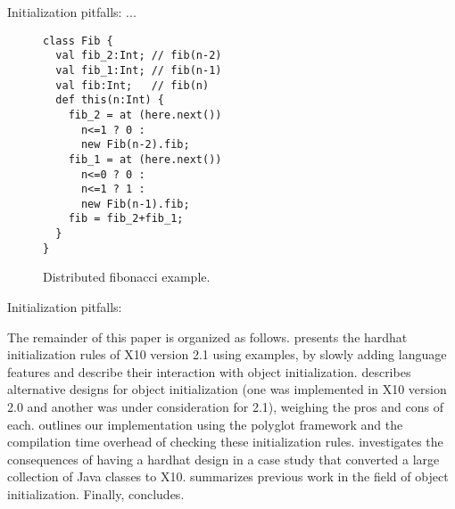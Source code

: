     Initialization pitfalls: ...

\begin{figure}
\begin{lstlisting}
class Fib {
  val fib_2:Int; // fib(n-2)
  val fib_1:Int; // fib(n-1)
  val fib:Int;   // fib(n)
  def this(n:Int) {
    fib_2 = at (here.next())
      n<=1 ? 0 :
      new Fib(n-2).fib;
    fib_1 = at (here.next())
      n<=0 ? 0 :
      n<=1 ? 1 :
      new Fib(n-1).fib;
    fib = fib_2+fib_1;
  }
}
\end{lstlisting}
\caption{Distributed fibonacci example.}
\label{Figure:DistributedFib}
\end{figure}


    Initialization pitfalls: 


The remainder of this paper is organized as follows.
 presents the hardhat initialization rules of X10 version 2.1
    using examples,
    by slowly adding language features and describe their interaction with
    object initialization.
 describes alternative designs for object initialization
    (one was implemented in X10 version 2.0 and another was under consideration for 2.1),
    weighing the pros and cons of each.
 outlines our implementation using the polyglot framework
    and the compilation time overhead of checking these initialization rules.
 investigates the consequences of having a hardhat design
    in a case study that converted a large collection of Java classes to X10.
 summarizes previous work in the field of object initialization.
Finally,  concludes.
